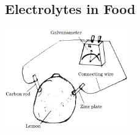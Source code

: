 \begin{multicols}{2}
%
%

\vfill
\columnbreak

\subsection{Electrolytes in Food}

\begin{center}
\includegraphics[width=0.4\textwidth]{./img/lechlanche-cell.png}
\end{center}


\end{multicols}
